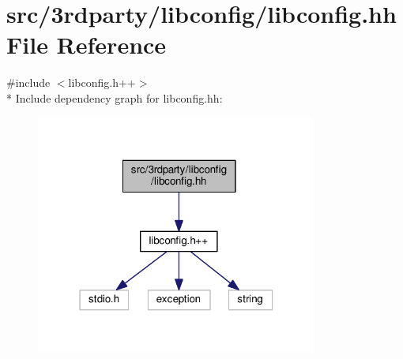 \hypertarget{libconfig_8hh}{\section{src/3rdparty/libconfig/libconfig.hh File Reference}
\label{libconfig_8hh}
}
{\ttfamily \#include $<$libconfig.\-h++$>$}\\*
Include dependency graph for libconfig.\-hh\-:\nopagebreak
\begin{figure}[H]
\begin{center}
\leavevmode
\includegraphics[width=262pt]{libconfig_8hh__incl}
\end{center}
\end{figure}

